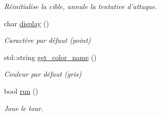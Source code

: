 \begin{DoxyCompactItemize}
\begin{DoxyCompactList}\small\item\em Réinitialise la cible, annule la tentative d'attaque. \end{DoxyCompactList}\item 
\hypertarget{classColonized__planet_a1d3897c8ef1772fa9908fee7c5830f77}{char \hyperlink{classColonized__planet_a1d3897c8ef1772fa9908fee7c5830f77}{display} ()}\label{classColonized__planet_a1d3897c8ef1772fa9908fee7c5830f77}

\begin{DoxyCompactList}\small\item\em Caractère par défaut (point) \end{DoxyCompactList}\item 
\hypertarget{classColonized__planet_af8e3c6d3e72bf80b2e44013ceba2087f}{std\-::string \hyperlink{classColonized__planet_af8e3c6d3e72bf80b2e44013ceba2087f}{get\-\_\-color\-\_\-name} ()}\label{classColonized__planet_af8e3c6d3e72bf80b2e44013ceba2087f}

\begin{DoxyCompactList}\small\item\em Couleur par défaut (gris) \end{DoxyCompactList}\item 
bool \hyperlink{classColonized__planet_a00293269f8b2ce00b45a23d89cb48015}{run} ()
\begin{DoxyCompactList}\small\item\em Joue le tour. \end{DoxyCompactList}\end{DoxyCompactItemize}

